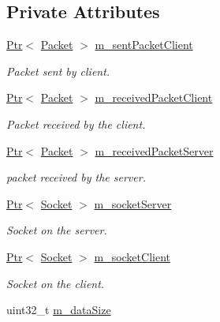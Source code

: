 \subsection*{Private Attributes}
\begin{DoxyCompactItemize}
\item 
\hyperlink{classns3_1_1Ptr}{Ptr}$<$ \hyperlink{classns3_1_1Packet}{Packet} $>$ \hyperlink{classSixlowpanFragmentationTest_a0931362b2249617e59dde62b9a8d41dc}{m\+\_\+sent\+Packet\+Client}
\begin{DoxyCompactList}\small\item\em Packet sent by client. \end{DoxyCompactList}\item 
\hyperlink{classns3_1_1Ptr}{Ptr}$<$ \hyperlink{classns3_1_1Packet}{Packet} $>$ \hyperlink{classSixlowpanFragmentationTest_aef2a91785b934e5a820b0286dbbec514}{m\+\_\+received\+Packet\+Client}
\begin{DoxyCompactList}\small\item\em Packet received by the client. \end{DoxyCompactList}\item 
\hyperlink{classns3_1_1Ptr}{Ptr}$<$ \hyperlink{classns3_1_1Packet}{Packet} $>$ \hyperlink{classSixlowpanFragmentationTest_a783ec541df1eacec01158508ad4a03cb}{m\+\_\+received\+Packet\+Server}
\begin{DoxyCompactList}\small\item\em packet received by the server. \end{DoxyCompactList}\item 
\hyperlink{classns3_1_1Ptr}{Ptr}$<$ \hyperlink{classns3_1_1Socket}{Socket} $>$ \hyperlink{classSixlowpanFragmentationTest_a385f27651f5ad9a16d8c8327a65abef9}{m\+\_\+socket\+Server}
\begin{DoxyCompactList}\small\item\em Socket on the server. \end{DoxyCompactList}\item 
\hyperlink{classns3_1_1Ptr}{Ptr}$<$ \hyperlink{classns3_1_1Socket}{Socket} $>$ \hyperlink{classSixlowpanFragmentationTest_a3d87ff33f33f43ba585f5772c0bdbd83}{m\+\_\+socket\+Client}
\begin{DoxyCompactList}\small\item\em Socket on the client. \end{DoxyCompactList}\item 
uint32\+\_\+t \hyperlink{classSixlowpanFragmentationTest_a9abb242135d4b3661d3d04d11202c03d}{m\+\_\+data\+Size}

\end{DoxyCompactItemize}
